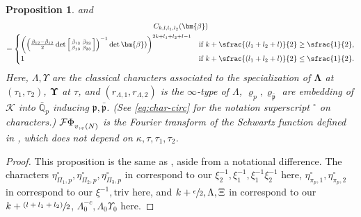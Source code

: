 \documentclass[JEP,XML,SOM,Unicode,published]{cedram}
\newcommand{\NoChangel}[1]{%
\expandafter\let\csname old\string#1\endcsname=#1
\let#1=\relax
\newcommand{#1}{\mathop{\mathcode`l="716C\csname old\string#1\endcsname\mathcode`l="7160}\displaylimits}%
}
\newenvironment{Smallbmatrix}{\Big[\begin{smallmatrix}}{\end{smallmatrix}\Big]}
\newcommand{\psfrac}[2]{\sfrac{(#1)}{#2}}
\theoremstyle{plain}
\newtheorem{prop}[thm]{Proposition}
\theoremstyle{remark}
\newcommand{\bQ}{\mathbb{Q}}
\newcommand{\cF}{\mathcal{F}}
\newcommand{\cK}{\mathcal{K}}
\newcommand{\fp}{\mathfrak{p}}
\newcommand{\bbeta}{\bm{\beta}}
\newcommand{\triv}{\mathrm{triv}}
\newcommand{\val}{\mathrm{val}}\NoChangel{\val}
\newcommand{\vol}{\mathrm{vol}}\NoChangel{\vol}
\let\Schw\Phi
\newcommand{\sPi}{\scriptscriptstyle{\Pi}}
\newcommand{\sLambda}{\scriptscriptstyle{\Lambda}}
\newcommand{\bLam}{\boldsymbol\Lambda}
\newcommand{\bUps}{\boldsymbol\Upsilon}
\begin{document}
\begin{prop}
and\vspace*{-5pt}
\begin{multline}\label{eq:Cbeta}
C_{k,l,l_1,l_2}(\bbeta)\\
=\begin{cases}
\biggl(\Bigl(\frac{\beta_{12}-\bar{\beta}_{12}}{2}\det\begin{Smallbmatrix}\bar{\beta}_{13}&\bar{\beta}_{23}\\ \beta_{13}&\beta_{23}\end{Smallbmatrix} \Bigr)^{-1}\det\bbeta) \biggr)^{2k+l_1+l_2+l-1} &\text{if }k+\psfrac{l_1+l_2+l}{2}\geq \sfrac{1}{2},\\
1&\text{if } k+\psfrac{l_1+l_2+l}{2}\leq \sfrac{1}{2}.
\end{cases}
\end{multline}
Here, $\Lambda,\Upsilon$ are the classical characters associated to the specialization of $\bLam$ at $(\tau_1,\tau_2)$, $\bUps$ at $\tau$, and $(r_{\sLambda,1},r_{\sLambda,2})$ is the $\infty$-type of $\Lambda$, $\varrho_p,\varrho_{\bar{\fp}}$ are embedding of $\cK$ into $\bar{\bQ}_p$ inducing $\fp,\bar{\fp}$. (See \eqref{eq:char-circ} for the notation superscript $^\circ$ on characters.) $\cF\Schw^{\vol}_{v,\val_v(N)}$ is the Fourier transform of the Schwartz function defined in \cite[\S3.3.3]{pFL}, which does not depend on $\kappa,\tau,\tau_1,\tau_2$.
\end{prop}

\begin{proof}
This proposition is the same as \cite[Prop.\,3.5.1]{pFL}, aside from a notational difference. The characters $\eta^\circ_{\sPi_1,p},\eta^\circ_{\sPi_2,p},\eta^\circ_{\sPi_3,p}$ in \loccit correspond to our $\xi^{-1}_2,\xi^{-1}_1,\xi^{-1}_1\xi^{-1}_2$ here, $\eta^\circ_{\pi_p,1},\eta^\circ_{\pi_p,2}$ in \loccit correspond to our $\xi^{-1},\triv$ here, and $k+\sfrac{\epsilon}{2},\Lambda,\Xi$ in \loccit correspond to our $k+\psfrac{l+l_1+l_2}{2}$, $\Lambda^{-c}_0,\Lambda_0\Upsilon_0$ here.
\end{proof}
\end{document}
